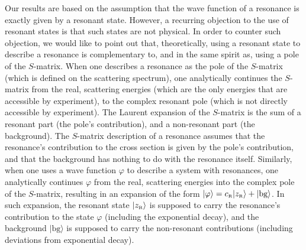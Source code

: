 \documentclass[12pt]{article}
\newcommand{\zr}{z_{\text{\tiny R}}}
\newcommand{\Cr}{c_{\text{\tiny R}}}
\begin{document}
Our results are based on the assumption that the wave function of a resonance
is exactly given by a resonant state. However,
a recurring objection to the use of resonant states is that such
states are not physical. In order to counter such objection, we would
like to point out that, theoretically, using a resonant state 
to describe a resonance is complementary to, and in the same spirit as, 
using a pole of the $S$-matrix. When one describes a resonance
as the pole of the $S$-matrix (which is defined on the scattering
spectrum), one analytically continues the $S$-matrix from the real, scattering
energies (which are the only energies that are accessible by experiment), to
the complex resonant pole (which is not directly accessible by 
experiment). The Laurent expansion of the $S$-matrix is
the sum of a resonant part (the pole's contribution), and a non-resonant part 
(the background). The $S$-matrix description of a resonance assumes that the
resonance's contribution to the cross section is given by the pole's 
contribution, and
that the background has nothing to do with the resonance itself. Similarly,
when one uses a wave function $\varphi$ to describe a system with 
resonances, one analytically continues $\varphi$ from the real, scattering
energies into the complex pole of the $S$-matrix, resulting in 
an expansion of the form
$|\varphi \rangle =\Cr |\zr \rangle + |\text{bg}\rangle$. In such expansion, 
the resonant state $|\zr \rangle$ is supposed to carry
the resonance's contribution to the state $\varphi$ (including the 
exponential decay), and the background $|\text{bg}\rangle$ is supposed 
to carry the non-resonant
contributions (including deviations from exponential decay). 
\end{document}
